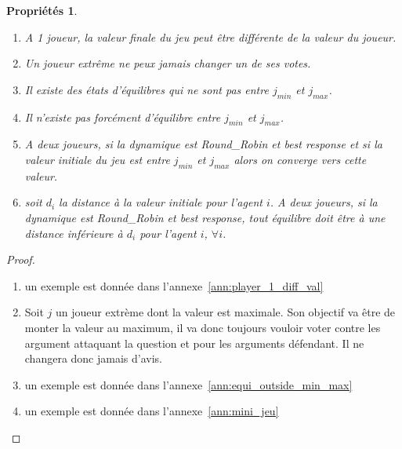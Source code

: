 \documentclass[11pt]{article}
\theoremstyle{defi}
\newtheorem{propriete}{Propriétés}[section]
\theoremstyle{not}
\theoremstyle{prob}
\begin{document}
        \begin{propriete}
          \begin{enumerate}
            \item A 1 joueur, la valeur finale du jeu peut être différente de la valeur du joueur.
            \item Un joueur extrême ne peux jamais changer un de ses votes.
            \item Il existe des états d'équilibres qui ne sont pas entre $j_{min}$ et $j_{max}$.
            \item Il n'existe pas forcément d'équilibre entre $j_{min}$ et $j_{max}$.
            \item A deux joueurs, si la dynamique est  \emph{Round\_Robin} et \emph{best response} et si la valeur initiale du jeu est entre $j_{min}$ et $j_{max}$ alors on converge vers cette valeur.
            \item soit $d_i$ la distance à la valeur initiale pour l'agent $i$. A deux joueurs, si la dynamique est  \emph{Round\_Robin} et \emph{best response}, tout équilibre doit être à une distance inférieure à $d_i$ pour l'agent $i$, $\forall i$.
          \end{enumerate}
        \end{propriete}

        \begin{proof}

          \begin{enumerate}
            \item un exemple est donnée dans l'annexe~\ref{ann:player_1_diff_val}
            \item Soit $j$ un joueur extrème dont la valeur est maximale.
            Son objectif va être de monter la valeur au maximum, il va donc toujours vouloir voter contre les argument attaquant la question et pour les arguments défendant.
            Il ne changera donc jamais d'avis.
            \item un exemple est donnée dans l'annexe~\ref{ann:equi_outside_min_max}
            \item un exemple est donnée dans l'annexe~\ref{ann:mini_jeu}
          \end{enumerate}
        \end{proof}
\end{document}
